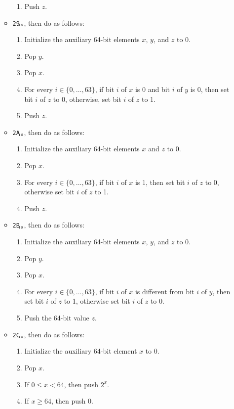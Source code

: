 \documentclass[a4paper,12pt]{article}
\newcommand{\num}[1]{\texttt{#1}\xspace}
\newcommand{\hex}[1]{\num{#1}$_{\textup{\tiny\hskip-1ex 16}}$\xspace}
\newcommand{\range}[2]{\{#1,\ldots,#2\}}
\newcommand{\op}[1]{#1}
\newcommand{\OR}        [1]{\op{\hex{29}}}
\newcommand{\NOT}       [1]{\op{\hex{2A}}}
\newcommand{\XOR}       [1]{\op{\hex{2B}}}
\newcommand{\POW}       [1]{\op{\hex{2C}}}
\begin{document}
\begin{enumerate}
\begin{itemize}
\begin{enumerate}
    \item Push $z$.
    \end{enumerate}
  \item \OR{}, then do as follows:
    \begin{enumerate}
    \item Initialize the auxiliary 64-bit elements $x$, $y$, and $z$ to 0.
    \item Pop $y$.
    \item Pop $x$.
    \item For every $i \in \range{0}{63}$, if bit $i$ of $x$ is 0 and bit $i$ of $y$ is 0, then set bit $i$ of $z$ to 0, otherwise, set bit $i$ of $z$ to 1. %
    \item Push $z$.
    \end{enumerate}
  \item \NOT{}, then do as follows:
    \begin{enumerate}
    \item Initialize the auxiliary 64-bit elements $x$ and $z$ to 0.
    \item Pop $x$.
    \item For every $i \in \range{0}{63}$, if bit $i$ of $x$ is 1, then set bit $i$ of $z$ to 0, otherwise set bit $i$ of $z$ to 1.
    \item Push $z$.
    \end{enumerate}
  \item \XOR{}, then do as follows:
    \begin{enumerate}
    \item Initialize the auxiliary 64-bit elements $x$, $y$, and $z$ to 0.
    \item Pop $y$.
    \item Pop $x$.
    \item For every $i \in \range{0}{63}$, if bit $i$ of $x$ is different from bit $i$ of $y$, then set bit $i$ of $z$ to 1, otherwise set bit $i$ of $z$ to 0.
    \item Push the 64-bit value $z$.
    \end{enumerate}
  \item \POW{}, then do as follows:
    \begin{enumerate}
    \item Initialize the auxiliary 64-bit element $x$ to 0.
    \item Pop $x$.
    \item If $0 \le x < 64$, then push $2^x$.
    \item If $x \ge 64$, then push 0.
    \end{enumerate}
  \end{itemize}
\end{enumerate}
\end{document}

